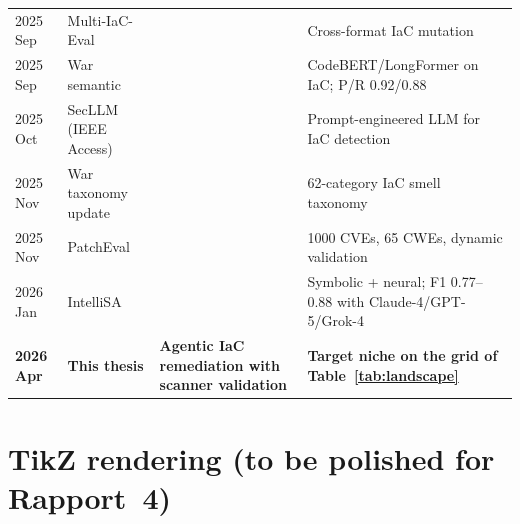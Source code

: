 \documentclass[11pt, a4paper]{report}
\begin{document}
\begin{table}[H]
\begin{tabularx}{\linewidth}{lll X}
    2025 Sep & Multi-IaC-Eval & \citep{multi2025iaceval}
    & Cross-format IaC mutation \\
    2025 Sep & War semantic & \citep{war2025detection}
    & CodeBERT/LongFormer on IaC; P/R 0.92/0.88 \\
    2025 Oct & SecLLM (IEEE Access) & \citep{devito2025secllm}
    & Prompt-engineered LLM for IaC detection \\
    2025 Nov & War taxonomy update & \citep{war2025taxonomy}
    & 62-category IaC smell taxonomy \\
    2025 Nov & PatchEval & \citep{lyu2024patcheval}
    & 1000 CVEs, 65 CWEs, dynamic validation \\
    2026 Jan & IntelliSA & \citep{intellisa2026}
    & Symbolic + neural; F1 0.77--0.88 with Claude-4/GPT-5/Grok-4 \\
    \midrule
    \rowcolor{yellow!15}
    \textbf{2026 Apr} & \textbf{This thesis} &
    \textbf{Agentic IaC remediation with scanner validation} &
    \textbf{Target niche on the grid of Table~\ref{tab:landscape}} \\
    \bottomrule
  \end{tabularx}
\end{table}

\section{TikZ rendering (to be polished for Rapport~4)}
\end{document}
